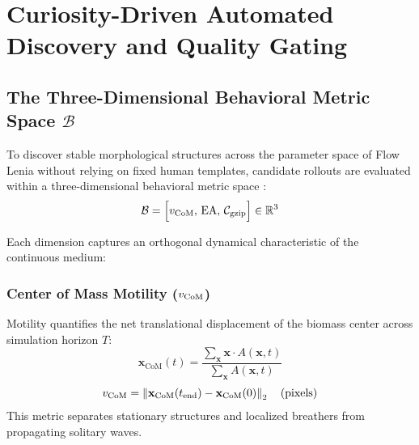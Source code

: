 \section{Curiosity-Driven Automated Discovery and Quality Gating}
\label{sec:automated_discovery}

\subsection{\texorpdfstring{The Three-Dimensional Behavioral Metric Space $\mathcal{B}$}{The Three-Dimensional Behavioral Metric Space}}
\label{subsec:discovery_metric_space}

To discover stable morphological structures across the parameter space of Flow Lenia without relying on fixed human templates, candidate rollouts are evaluated within a three-dimensional behavioral metric space \parencite{michel2025exploring}:
\begin{equation}
\mathcal{B} = \Big[ v_{\text{CoM}}, \, \text{EA}, \, \mathcal{C}_{\text{gzip}} \Big] \in \mathbb{R}^3
\label{eq:metric_space_definition}
\end{equation}

Each dimension captures an orthogonal dynamical characteristic of the continuous medium:

\subsubsection{\texorpdfstring{Center of Mass Motility ($v_{\text{CoM}}$)}{Center of Mass Motility}}
Motility quantifies the net translational displacement of the biomass center across simulation horizon $T$:
\begin{equation}
\mathbf{x}_{\text{CoM}}(t) = \frac{\sum_{\mathbf{x}} \mathbf{x} \cdot A(\mathbf{x}, t)}{\sum_{\mathbf{x}} A(\mathbf{x}, t)}
\label{eq:com_definition}
\end{equation}
\begin{equation}
v_{\text{CoM}} = \left\| \mathbf{x}_{\text{CoM}}(t_{\text{end}}) - \mathbf{x}_{\text{CoM}}(0) \right\|_2 \quad (\text{pixels})
\label{eq:motility_metric}
\end{equation}
This metric separates stationary structures and localized breathers from propagating solitary waves.

